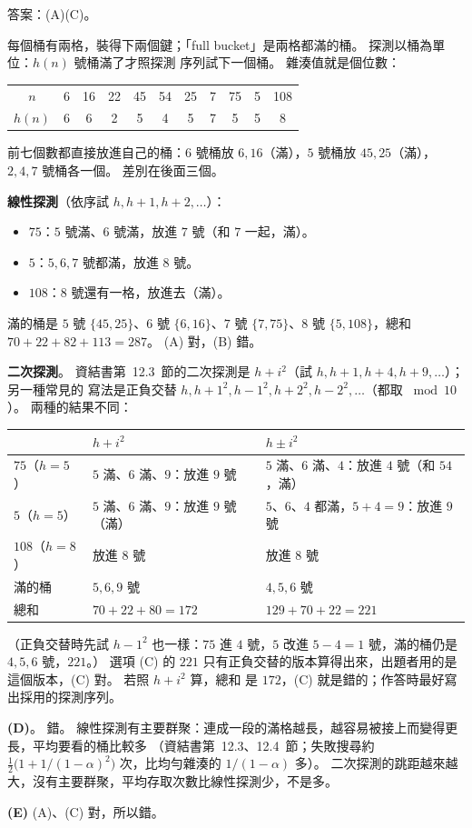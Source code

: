 \begin{pastsoln}
答案：(A)(C)。

每個桶有兩格，裝得下兩個鍵；「full bucket」是兩格都滿的桶。 探測以桶為單位：$h(n)$ 號桶滿了才照探測
序列試下一個桶。 雜湊值就是個位數：
\begin{center}
\small
\begin{tabular}{c*{10}{c}}
\toprule
$n$ & 6 & 16 & 22 & 45 & 54 & 25 & 7 & 75 & 5 & 108 \\
$h(n)$ & 6 & 6 & 2 & 5 & 4 & 5 & 7 & 5 & 5 & 8 \\
\bottomrule
\end{tabular}
\end{center}
前七個數都直接放進自己的桶：$6$ 號桶放 $6, 16$（滿），$5$ 號桶放 $45, 25$（滿），$2, 4, 7$ 號桶各一個。
差別在後面三個。

\textbf{線性探測}（依序試 $h, h+1, h+2, \ldots$）：
\begin{itemize}
\item $75$：$5$ 號滿、$6$ 號滿，放進 $7$ 號（和 $7$ 一起，滿）。
\item $5$：$5, 6, 7$ 號都滿，放進 $8$ 號。
\item $108$：$8$ 號還有一格，放進去（滿）。
\end{itemize}
滿的桶是 $5$ 號 $\{45, 25\}$、$6$ 號 $\{6, 16\}$、$7$ 號 $\{7, 75\}$、$8$ 號 $\{5, 108\}$，總和
$70 + 22 + 82 + 113 = 287$。 (A) 對，(B) 錯。

\textbf{二次探測}。 資結書第~12.3~節的二次探測是 $h + i^2$（試 $h, h+1, h+4, h+9, \ldots$）；另一種常見的
寫法是正負交替 $h, h+1^2, h-1^2, h+2^2, h-2^2, \ldots$（都取 $\bmod 10$）。 兩種的結果不同：
\begin{center}
\small
\begin{tabular}{lll}
\toprule
 & $h + i^2$ & $h \pm i^2$ \\
\midrule
$75$（$h = 5$） & $5$ 滿、$6$ 滿、$9$：放進 $9$ 號 & $5$ 滿、$6$ 滿、$4$：放進 $4$ 號（和 $54$，滿） \\
$5$（$h = 5$） & $5$ 滿、$6$ 滿、$9$：放進 $9$ 號（滿） & $5$、$6$、$4$ 都滿，$5 + 4 = 9$：放進 $9$ 號 \\
$108$（$h = 8$） & 放進 $8$ 號 & 放進 $8$ 號 \\
\midrule
滿的桶 & $5, 6, 9$ 號 & $4, 5, 6$ 號 \\
總和 & $70 + 22 + 80 = 172$ & $129 + 70 + 22 = 221$ \\
\bottomrule
\end{tabular}
\end{center}
（正負交替時先試 $h - 1^2$ 也一樣：$75$ 進 $4$ 號，$5$ 改進 $5 - 4 = 1$ 號，滿的桶仍是 $4, 5, 6$ 號，$221$。）
選項 (C) 的 $221$ 只有正負交替的版本算得出來，出題者用的是這個版本，(C) 對。 若照 $h + i^2$ 算，總和
是 $172$，(C) 就是錯的；作答時最好寫出採用的探測序列。

\textbf{(D)}。 錯。 線性探測有主要群聚：連成一段的滿格越長，越容易被接上而變得更長，平均要看的桶比較多
（資結書第~12.3、12.4~節；失敗搜尋約 $\frac12\bigl(1 + 1/(1-\alpha)^2\bigr)$ 次，比均勻雜湊的
$1/(1 - \alpha)$ 多）。 二次探測的跳距越來越大，沒有主要群聚，平均存取次數比線性探測少，不是多。

\textbf{(E)} (A)、(C) 對，所以錯。
\end{pastsoln}
